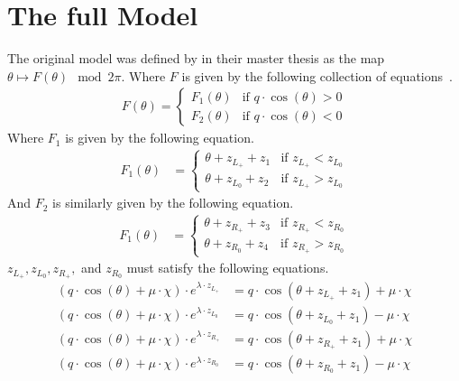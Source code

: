 \section{The full Model}
\label{sec:og.full}

The original model was defined by  in their master thesis as the map $\theta \mapsto F(\theta) \mod 2 \pi$.
Where $F$ is given by the following collection of equations~\cite{akyuz2022}.
\begin{align}
    F(\theta) = \begin{cases}
        F_1(\theta) & \text{if } q \cdot \cos(\theta) > 0 \\
        F_2(\theta) & \text{if } q \cdot \cos(\theta) < 0
    \end{cases}
\end{align}
Where $F_1$ is given by the following equation.
\begin{align}
    F_1(\theta) & = \begin{cases}
        \theta + z_{L_+} + z_1 & \text{if } z_{L_+} < z_{L_0} \\
        \theta + z_{L_0} + z_2 & \text{if } z_{L_+} > z_{L_0}
    \end{cases}
\end{align}
And $F_2$ is similarly given by the following equation.
\begin{align}
    F_1(\theta) & = \begin{cases}
        \theta + z_{R_+} + z_3 & \text{if } z_{R_+} < z_{R_0} \\
        \theta + z_{R_0} + z_4 & \text{if } z_{R_+} > z_{R_0}
    \end{cases}
\end{align}
$z_{L_+}, z_{L_0}, z_{R_+},$ and $z_{R_0}$ must satisfy the following equations.
\begin{subequations}
\begin{align}
    (q \cdot \cos(\theta) + \mu \cdot \chi) \cdot e^{\lambda \cdot z_{L_+}}
    & = q \cdot \cos(\theta + z_{L_+} + z_1) + \mu \cdot \chi \\
    (q \cdot \cos(\theta) + \mu \cdot \chi) \cdot e^{\lambda \cdot z_{L_0}}
    & = q \cdot \cos(\theta + z_{L_0} + z_1) - \mu \cdot \chi \\
    (q \cdot \cos(\theta) + \mu \cdot \chi) \cdot e^{\lambda \cdot z_{R_+}}
    & = q \cdot \cos(\theta + z_{R_+} + z_1) + \mu \cdot \chi \\
    (q \cdot \cos(\theta) + \mu \cdot \chi) \cdot e^{\lambda \cdot z_{R_0}}
    & = q \cdot \cos(\theta + z_{R_0} + z_1) - \mu \cdot \chi
\end{align}
\end{subequations}
